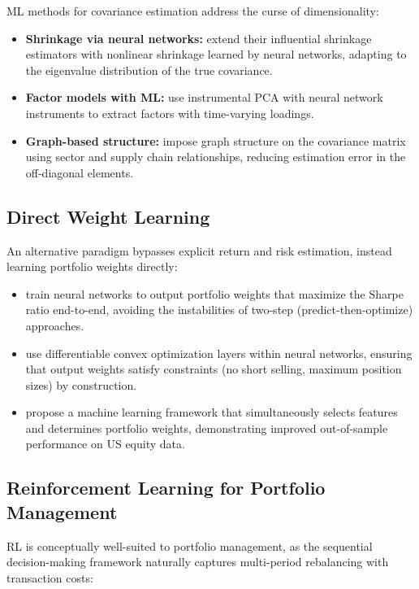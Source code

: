 ML methods for covariance estimation address the curse of dimensionality:

\begin{itemize}[leftmargin=*]
    \item \textbf{Shrinkage via neural networks:} \citet{Ledoit2022} extend their influential shrinkage estimators with nonlinear shrinkage learned by neural networks, adapting to the eigenvalue distribution of the true covariance.
    \item \textbf{Factor models with ML:} \citet{Kelly2019} use instrumental PCA with neural network instruments to extract factors with time-varying loadings.
    \item \textbf{Graph-based structure:} \citet{Zhao2022} impose graph structure on the covariance matrix using sector and supply chain relationships, reducing estimation error in the off-diagonal elements.
\end{itemize}

\subsection{Direct Weight Learning}

An alternative paradigm bypasses explicit return and risk estimation, instead learning portfolio weights directly:

\begin{itemize}[leftmargin=*]
    \item \citet{Zhang2020} train neural networks to output portfolio weights that maximize the Sharpe ratio end-to-end, avoiding the instabilities of two-step (predict-then-optimize) approaches.
    \item \citet{Butler2023} use differentiable convex optimization layers within neural networks, ensuring that output weights satisfy constraints (no short selling, maximum position sizes) by construction.
    \item \citet{Ban2018} propose a machine learning framework that simultaneously selects features and determines portfolio weights, demonstrating improved out-of-sample performance on US equity data.
\end{itemize}

\subsection{Reinforcement Learning for Portfolio Management}

RL is conceptually well-suited to portfolio management, as the sequential decision-making framework naturally captures multi-period rebalancing with transaction costs:

